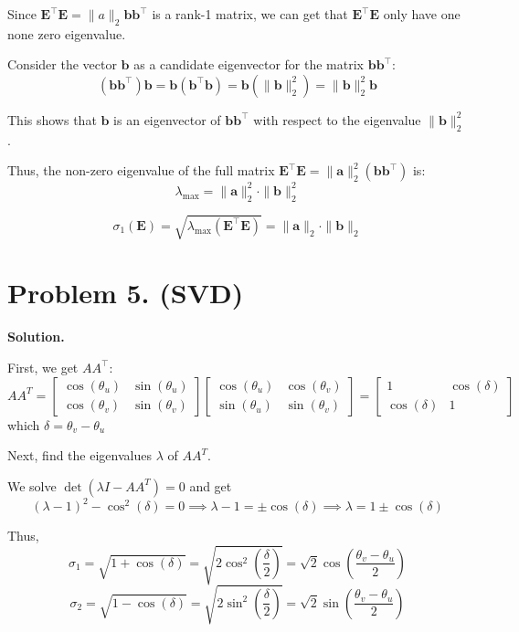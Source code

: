 \documentclass{article}
\newcommand{\0}{{\mathbf{0}}} %
\begin{document}
Since $\mathbf{E}^\top \mathbf{E} = \|a\|_2 \mathbf{b} \mathbf{b}^\top$ is a rank-1 matrix,
we can get that $\mathbf{E}^\top \mathbf{E}$ only have one none zero eigenvalue.

Consider the vector $\mathbf{b}$ as a candidate eigenvector for the matrix
$\mathbf{b}\mathbf{b}^\top$:
$$(\mathbf{b}\mathbf{b}^\top) \mathbf{b} = \mathbf{b} (\mathbf{b}^\top \mathbf{b}) = \mathbf{b} (\|\mathbf{b}\|_2^2) = \|\mathbf{b}\|_2^2 \mathbf{b}$$

This shows that $\mathbf{b}$ is an eigenvector of $\mathbf{b}\mathbf{b}^\top$ with respect to the eigenvalue $\|\mathbf{b}\|_2^2$.

Thus, the non-zero eigenvalue of the full matrix $\mathbf{E}^\top \mathbf{E} = \|\mathbf{a}\|_2^2 (\mathbf{b}\mathbf{b}^\top)$ is:
$$\lambda_{\max} = \|\mathbf{a}\|_2^2 \cdot \|\mathbf{b}\|_2^2$$

$$\sigma_1(\mathbf{E}) = \sqrt{\lambda_{\max}(\mathbf{E}^\top \mathbf{E})} = \|\mathbf{a}\|_2 \cdot \|\mathbf{b}\|_2$$

\section*{Problem 5. (SVD)}

\textbf{Solution.}

First, we get $A A^\top$:
$$AA^T =
\begin{bmatrix} \cos(\theta_u) & \sin(\theta_u) \\ \cos(\theta_v) & \sin(\theta_v)
\end{bmatrix}
\begin{bmatrix} \cos(\theta_u) & \cos(\theta_v) \\ \sin(\theta_u) & \sin(\theta_v)
\end{bmatrix} =
\begin{bmatrix} 1 & \cos(\delta) \\ \cos(\delta) & 1
\end{bmatrix}$$
which $\delta = \theta_v - \theta_u $

Next, find the eigenvalues $\lambda$ of $AA^T$.

We solve $\det(\lambda I - AA^T) = 0$ and get
$$(\lambda - 1)^2 - \cos^2(\delta) = 0 \implies \lambda - 1 = \pm \cos(\delta) \implies \lambda = 1 \pm \cos(\delta)$$

Thus,
$$\sigma_1 = \sqrt{1 + \cos(\delta)} = \sqrt{2\cos^2(\frac{\delta}{2})} = \sqrt{2}\cos\left(\frac{\theta_v - \theta_u}{2}\right)$$
$$\sigma_2 = \sqrt{1 - \cos(\delta)} = \sqrt{2\sin^2(\frac{\delta}{2})} = \sqrt{2}\sin\left(\frac{\theta_v - \theta_u}{2}\right)$$
\end{document}
